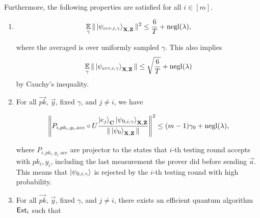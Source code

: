 \begin{lemma}
Furthermore, the following properties are satisfied for all $i\in[m]$.
%
\begin{enumerate}
    \item \label{property:partition-err}  $$\operatorname*{\mathbb{E}}_{\gamma}\|\ket{\psi_{err,i,\gamma}}_{\mathbf{X},\mathbf{Z}}\|^2 \leq \frac{6}{T}+\operatorname{negl}(\lambda),$$
    
    where the averaged is over uniformly sampled $\gamma$. This also implies
    \begin{align}
        \operatorname*{\mathbb{E}}_{\gamma}\|\ket{\psi_{err,i,\gamma}}_{\mathbf{X},\mathbf{Z}}\| \leq \sqrt{\frac{6}{T}}+\operatorname{negl}(\lambda)
    \end{align}
by Cauchy's inequality.
    
        \item \label{property:partition-testing}
For all $\vec{pk}$, $\vec{y}$, fixed $\gamma$, and  $j\neq i$, we have
 

 \begin{align}
    \left\lVert P_{i,pk_i,y_i,acc} \circ U\frac{\ket{e_j}_{\mathbf{C}}\ket{\psi_{0,i,\gamma}}_{\mathbf{X},\mathbf{Z}}}{\|\ket{\psi_0}_{\mathbf{X},\mathbf{Z}}\|}\right\rVert^2 \leq (m-1)\gamma_0+\operatorname{negl}(\lambda),
 \end{align}
 
 
where $P_{i,pk_i,y_i,acc}$ are projector to the states that $i$-th testing round accepts with $pk_i,y_i$, including the last measurement the prover did before sending $\vec{a}$.  This means that $\ket{\psi_{0,i,\gamma}}$ is rejected by the $i$-th testing round with high probability.


    \item \label{property:partition-binding}
    
For all $\vec{pk}$, $\vec{y}$, fixed $\gamma$, and $j\neq i$, there exists an efficient quantum algorithm $\mathsf{Ext}_i$ such that


\end{enumerate}
\end{lemma}
